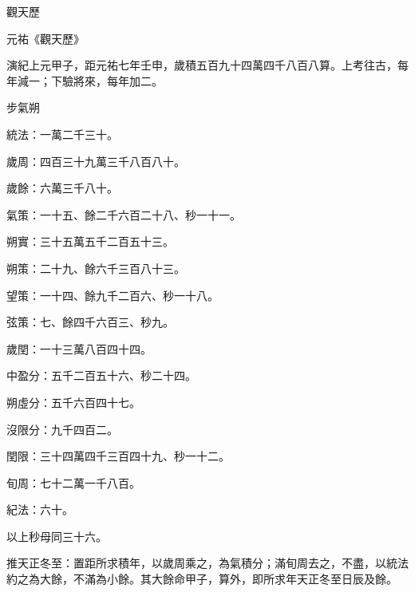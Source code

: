 
\begin{pinyinscope}

 觀天歷



 元祐《觀天歷》



 演紀上元甲子，距元祐七年壬申，歲積五百九十四萬四千八百八算。上考往古，每年減一；下驗將來，每年加二。



 步氣朔



 統法：一萬二千三十。



 歲周：四百三十九萬三千八百八十。



 歲餘：六萬三千八十。



 氣策：一十五、餘二千六百二十八、秒一十一。



 朔實：三十五萬五千二百五十三。



 朔策：二十九、餘六千三百八十三。



 望策：一十四、餘九千二百六、秒一十八。



 弦策：七、餘四千六百三、秒九。



 歲閏：一十三萬八百四十四。



 中盈分：五千二百五十六、秒二十四。



 朔虛分：五千六百四十七。



 沒限分：九千四百二。



 閏限：三十四萬四千三百四十九、秒一十二。



 旬周：七十二萬一千八百。



 紀法：六十。



 以上秒母同三十六。



 推天正冬至：置距所求積年，以歲周乘之，為氣積分；滿旬周去之，不盡，以統法約之為大餘，不滿為小餘。其大餘命甲子，算外，即所求年天正冬至日辰及餘。




\end{pinyinscope}
